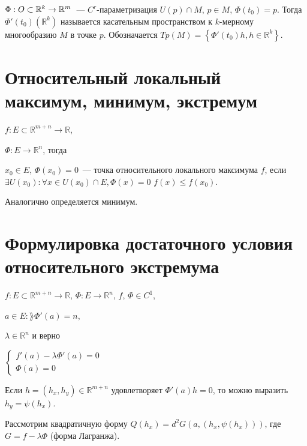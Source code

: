 \documentclass{article}
\begin{document}
        $\Phi : O \subset \mathbb{R}^k \rightarrow \mathbb{R}^m$~--- $C^r$-параметризация $U(p) \cap M$, $p \in M$, $\Phi(t_0) = p$. Тогда $\Phi'(t_0) \left( \mathbb{R}^k \right)$ называется касательным пространством к $k$-мерному многообразию $M$ в точке $p$. Обозначается $Tp(M) = \left\{ \Phi'(t_0) h, h \in \mathbb{R}^k \right\}$.
        
    \newpage
    
    \section{Относительный локальный максимум, минимум, экстремум}
    
        $f : E \subset \mathbb{R}^{m + n} \rightarrow \mathbb{R}$,
        
        $\Phi : E \rightarrow \mathbb{R}^n$, тогда
        
        $x_0 \in E$, $\Phi(x_0) = 0$~--- точка относительного локального максимума $f$, если $\exists U (x_0) : \forall x \in U(x_0) \cap E, \Phi(x) = 0$ $f(x) \leq f(x_0)$. 
        
        Аналогично определяется минимум.
        
    \newpage
    
    \section{Формулировка достаточного условия относительного экстремума}
    
        $f : E \subset \mathbb{R}^{m + n} \rightarrow \mathbb{R}$, $\Phi : E \rightarrow \mathbb{R}^n$, $f$, $\Phi \in C^1$, 
        
        $a \in E : \rang \Phi'(a) = n$,
        
        $\lambda \in \mathbb{R}^n$ и верно
        
        $
            \begin{cases}
    
                f'(a) - \lambda \Phi'(a) = 0 \\
                
                \Phi(a) = 0
                
            \end{cases}
        $
        
        Если $h = ( h_x, h_y ) \in \mathbb{R}^{m + n}$ удовлетворяет $\Phi'(a) h = 0$, то можно выразить $h_y = \psi(h_x)$.
        
        Рассмотрим квадратичную форму $Q(h_x) = d^2 G(a, \left( h_x, \psi (h_x ) \right) )$, где $G = f - \lambda \Phi$ (форма Лагранжа).
        
\end{document}
